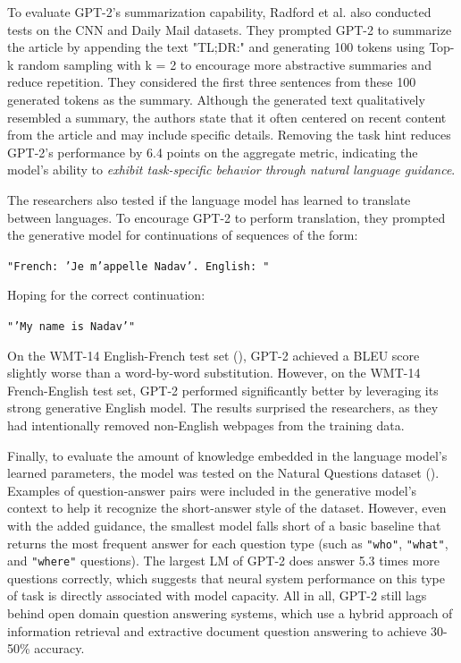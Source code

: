\documentclass{article}
\begin{document}
\medskip
\noindent
To evaluate GPT-2's summarization capability, Radford et al. also conducted tests on the CNN and Daily Mail datasets. They prompted GPT-2 to summarize the article by appending the text "TL;DR:" and generating 100 tokens using Top-k random sampling with k = 2 to encourage more abstractive summaries and reduce repetition. They considered the first three sentences from these 100 generated tokens as the summary. Although the generated text qualitatively resembled a summary, the authors state that it often centered on recent content from the article and may include specific details. Removing the task hint reduces GPT-2's performance by 6.4 points on the aggregate metric, indicating the model's ability to \emph{exhibit task-specific behavior through natural language guidance}.

\medskip
\noindent
The researchers also tested if the language model has learned to translate between languages. To encourage GPT-2 to perform translation, they prompted the generative model for continuations of sequences of the form:
\begin{center}
    \texttt{"French: 'Je m'appelle Nadav'. English: "}\\
\end{center}
Hoping for the correct continuation:
\begin{center}
    \texttt{"'My name is Nadav'"}
\end{center}
On the WMT-14 English-French test set (\citet{bojar2014wml14}), GPT-2 achieved a BLEU score slightly worse than a word-by-word substitution. However, on the WMT-14 French-English test set, GPT-2 performed significantly better by leveraging its strong generative English model. The results surprised the researchers, as they had intentionally removed non-English webpages from the training data.

\medskip
\noindent
Finally, to evaluate the amount of knowledge embedded in the language model's learned parameters, the model was tested on the Natural Questions dataset (\citet{kwiatkowski2019nq}). Examples of question-answer pairs were included in the generative model's context to help it recognize the short-answer style of the dataset. However, even with the added guidance, the smallest model falls short of a basic baseline that returns the most frequent answer for each question type (such as \texttt{"who"}, \texttt{"what"}, and \texttt{"where"} questions). The largest LM of GPT-2 does answer 5.3 times more questions correctly, which suggests that neural system performance on this type of task is directly associated with model capacity. All in all, GPT-2 still lags behind open domain question answering systems, which use a hybrid approach of information retrieval and extractive document question answering to achieve 30-50\% accuracy.
\end{document}

